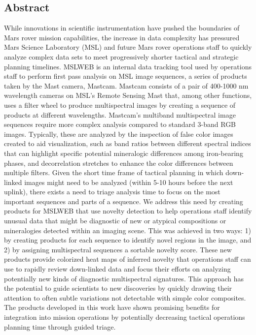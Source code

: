 \subsection{Abstract}
While innovations in scientific instrumentation have pushed the boundaries of Mars rover mission capabilities, the increase in data complexity has pressured Mars Science Laboratory (MSL) and future Mars rover operations staff to quickly analyze complex data sets to meet progressively shorter tactical and strategic planning timelines. MSLWEB is an internal data tracking tool used by operations staff to perform first pass analysis on MSL image sequences, a series of products taken by the Mast camera, Mastcam. Mastcam consists of a pair of 400-1000 nm wavelength cameras on MSL's Remote Sensing Mast that, among other functions, uses a filter wheel to produce multispectral images by creating a sequence of products at different wavelengths. Mastcam's multiband multispectral image sequences require more complex analysis compared to standard 3-band RGB images. Typically, these are analyzed by the inspection of false color images created to aid visualization, such as band ratios between different spectral indices that can highlight specific potential mineralogic differences among iron-bearing phases, and decorrelation stretches to enhance the color differences between multiple filters. Given the short time frame of tactical planning in which down-linked images might need to be analyzed (within 5-10 hours before the next uplink), there exists a need to triage analysis time to focus on the most important sequences and parts of a sequence. We address this need by creating products for MSLWEB that use novelty detection to help operations staff identify unusual data that might be diagnostic of new or atypical compositions or mineralogies detected within an imaging scene. This was achieved in two ways: 1) by creating products for each sequence to identify novel regions in the image, and 2) by assigning multispectral sequences a sortable novelty score. These new products provide colorized heat maps of inferred novelty that operations staff can use to rapidly review down-linked data and focus their efforts on analyzing potentially new kinds of diagnostic multispectral signatures. This approach has the potential to guide scientists to new discoveries by quickly drawing their attention to often subtle variations not detectable with simple color composites. The products developed in this work have shown promising benefits for integration into mission operations by potentially decreasing tactical operations planning time through guided triage.

